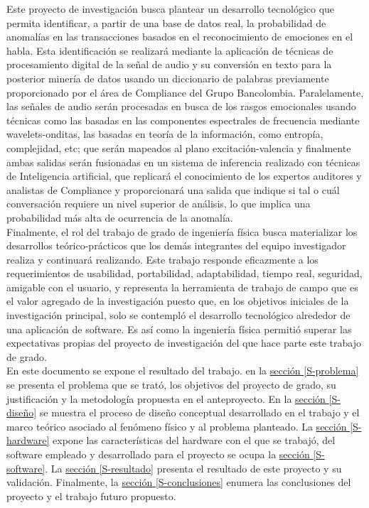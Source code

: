 \documentclass[11pt,lettersize]{article} %
\newcommand{\seccion}[1]{\hyperref[{#1}]{sección \ref*{#1}}}
\begin{document}
Este proyecto de investigación busca plantear un desarrollo tecnológico que permita identificar, a partir de una base de datos real, la probabilidad de anomalías en las transacciones basados en el reconocimiento de emociones en el habla. Esta identificación se realizará mediante la aplicación de técnicas de procesamiento digital de la señal de audio y su conversión en texto para la posterior minería de datos usando un diccionario de palabras previamente proporcionado por el área de Compliance del Grupo Bancolombia. Paralelamente, las señales de audio serán procesadas en busca de los rasgos emocionales usando técnicas como las basadas en las componentes espectrales de frecuencia mediante wavelets-onditas, las basadas en teoría de la información, como entropía, complejidad, etc; que serán mapeados al plano excitación-valencia y finalmente ambas salidas serán fusionadas en un sistema de inferencia realizado con técnicas de Inteligencia artificial, que replicará el conocimiento de los expertos auditores y analistas de Compliance y proporcionará una salida que indique si tal o cuál conversación requiere un nivel superior de análisis, lo que implica una probabilidad más alta de ocurrencia de la anomalía.\\

Finalmente, el rol del trabajo de grado de ingeniería física busca materializar los desarrollos teórico-prácticos que los demás integrantes del equipo investigador realiza y continuará realizando. Este trabajo responde eficazmente a los requerimientos de usabilidad, portabilidad, adaptabilidad, tiempo real, seguridad, amigable con el usuario, y representa la herramienta de trabajo de campo que es el valor agregado de la investigación puesto que, en los objetivos iniciales de la investigación principal, solo se contempló el desarrollo tecnológico alrededor de una aplicación de software. Es así como la ingeniería física permitió superar las expectativas propias del proyecto de investigación del que hace parte este trabajo de grado.\\

En este documento se expone el resultado del trabajo. en la \seccion{S-problema} se presenta el problema que se trató, los objetivos del proyecto de grado, su justificación y la metodología propuesta en el anteproyecto. En la \seccion{S-diseño} se muestra el proceso de diseño conceptual desarrollado en el trabajo y el marco teórico asociado al fenómeno físico y al problema planteado. La \seccion{S-hardware} expone las características del hardware con el que se trabajó, del software empleado y desarrollado para el proyecto se ocupa la \seccion{S-software}. La \seccion{S-resultado} presenta el resultado de este proyecto y su validación. Finalmente, la \seccion{S-conclusiones} enumera las conclusiones del proyecto y el trabajo futuro propuesto.
\end{document}
